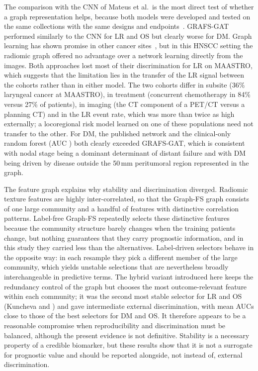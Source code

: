 \documentclass[11pt,a4paper]{article}
\newcommand{\method}{GRAFS-GAT}
\begin{document}
The comparison with the CNN of Mateus et al.\ is the most direct test of whether a graph representation helps, because both models were developed and tested on the same collections with the same designs and endpoints~\cite{mateus2023}. \method{} performed similarly to the CNN for LR and OS but clearly worse for DM. Graph learning has shown promise in other cancer sites~\cite{zhou2026radiopathomic,li2026cervical,pan2025glioma}, but in this HNSCC setting the radiomic graph offered no advantage over a network learning directly from the images. Both approaches lost most of their discrimination for LR on MAASTRO, which suggests that the limitation lies in the transfer of the LR signal between the cohorts rather than in either model. The two cohorts differ in subsite (36\% laryngeal cancer at MAASTRO), in treatment (concurrent chemotherapy in 84\% versus 27\% of patients), in imaging (the CT component of a PET/CT versus a planning CT) and in the LR event rate, which was more than twice as high externally; a locoregional risk model learned on one of these populations need not transfer to the other. For DM, the published network and the clinical-only random forest (AUC \aucDMCVClinClinRF) both clearly exceeded \method, which is consistent with nodal stage being a dominant determinant of distant failure and with DM being driven by disease outside the 50\,mm peritumoral region represented in the graph.

The feature graph explains why stability and discrimination diverged. Radiomic texture features are highly inter-correlated, so that the Graph-FS graph consists of one large community and a handful of features with distinctive correlation patterns. Label-free Graph-FS repeatedly selects these distinctive features because the community structure barely changes when the training patients change, but nothing guarantees that they carry prognostic information, and in this study they carried less than the alternatives. Label-driven selectors behave in the opposite way: in each resample they pick a different member of the large community, which yields unstable selections that are nevertheless broadly interchangeable in predictive terms. The hybrid variant introduced here keeps the redundancy control of the graph but chooses the most outcome-relevant feature within each community; it was the second most stable selector for LR and OS (Kuncheva \kunHybLR{} and \kunHybOS) and gave intermediate external discrimination, with mean AUCs close to those of the best selectors for DM and OS. It therefore appears to be a reasonable compromise when reproducibility and discrimination must be balanced, although the present evidence is not definitive. Stability is a necessary property of a credible biomarker, but these results show that it is not a surrogate for prognostic value and should be reported alongside, not instead of, external discrimination.
\end{document}
